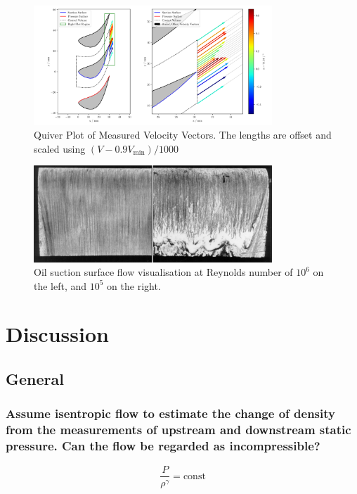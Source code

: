 \documentclass{article}
\begin{document}
\begin{figure}[H]
    \centering
    \includegraphics[width=0.8\textwidth]{figures/quiver_plot.png}
    \caption{Quiver Plot of Measured Velocity Vectors. The lengths are offset and scaled using $(V-0.9V_\text{min})/1000$}
    \label{fig:quiver_plot}
\end{figure}

\begin{figure}[H]
    \centering
    \includegraphics[width=0.8\textwidth]{figures/surface_vis.png}
    \caption{Oil suction surface flow visualisation at Reynolds number of $10^6$ on the left, and $10^5$ on the right.}
    \label{fig:surface_vis}
\end{figure}

\section{Discussion}

\subsection{General}

\subsubsection{ Assume isentropic flow to estimate the change of density from the measurements of
upstream and downstream static pressure. Can the flow be regarded as incompressible?}

\begin{equation}
    \frac{P}{\rho^\gamma} = \text{const}
\end{equation}
\end{document}
